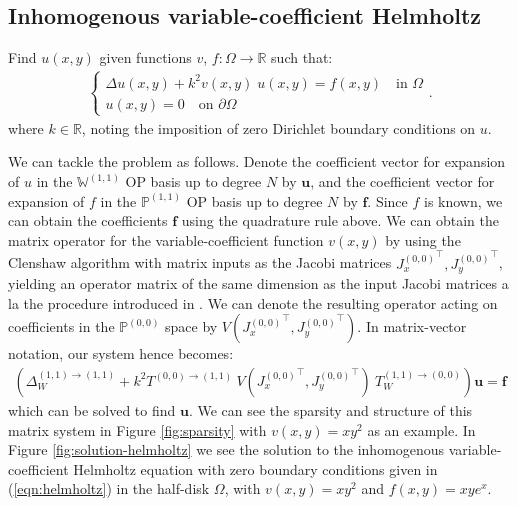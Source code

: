 \documentclass[11pt, oneside]{article}   	%
\newcommand{\R}{\mathbb{R}}
\newcommand{\bigPii}{{\mathbb{P}^{(1,1)}}}
\newcommand{\bigPoo}{{\mathbb{P}^{(0,0)}}}
\newcommand{\laplacewii}{\Delta_W^{(1,1)\to(1,1)}}
\newcommand{\bigWii}{{\mathbb{W}^{(1,1)}}}
\begin{document}
\subsection{Inhomogenous variable-coefficient Helmholtz}

Find \(u(x,y)\) given functions $v$, $f : \Omega \to \R$ such that:
\begin{align}
	\begin{cases}
    		\Delta u(x,y) + k^2 v(x,y) \; u(x,y) = f(x,y) \quad \text{in } \Omega \\
		u(x,y) = 0 \quad \text{on } \partial \Omega
	\end{cases}.
	\label{eqn:helmholtz}
\end{align}
where $k \in \R$, noting the imposition of zero Dirichlet boundary conditions on $u$.

We can tackle the problem as follows. Denote the coefficient vector for expansion of $u$ in the $\bigWii$ OP basis up to degree $N$ by $\mathbf{u}$, and the coefficient vector for expansion of $f$ in the $\bigPii$ OP basis up to degree $N$ by $\mathbf{f}$. Since $f$ is known, we can obtain  the coefficients $\mathbf{f}$ using the quadrature rule above. We can obtain the matrix operator for the variable-coefficient function $v(x,y)$ by using the Clenshaw algorithm with matrix inputs as the Jacobi matrices ${J_x^{(0,0)}}^\top, {J_y^{(0,0)}}^\top$, yielding an operator matrix of the same dimension as the input Jacobi matrices a la the procedure introduced in \cite{olver2019triangle}. We can denote the resulting operator acting on coefficients in the $\bigPoo$ space by $V({J_x^{(0,0)}}^\top, {J_y^{(0,0)}}^\top)$. In matrix-vector notation, our system hence becomes:
\begin{align}
    (\laplacewii + k^2 T^{(0,0)\to(1,1)} \: V({J_x^{(0,0)}}^\top, {J_y^{(0,0)}}^\top) \: T_W^{(1,1)\to(0,0)}) \mathbf{u} = \mathbf{f}
\end{align}
which can be solved to find $\mathbf{u}$. We can see the sparsity and structure of this matrix system in Figure \ref{fig:sparsity} with $v(x,y) = xy^2$ as an example. In Figure \ref{fig:solution-helmholtz} we see the solution to the inhomogenous variable-coefficient Helmholtz equation with zero boundary conditions given in (\ref{eqn:helmholtz}) in the half-disk $\Omega$, with  $v(x,y) = xy^2$ and $f(x,y) = xy e^x$.
\end{document}
